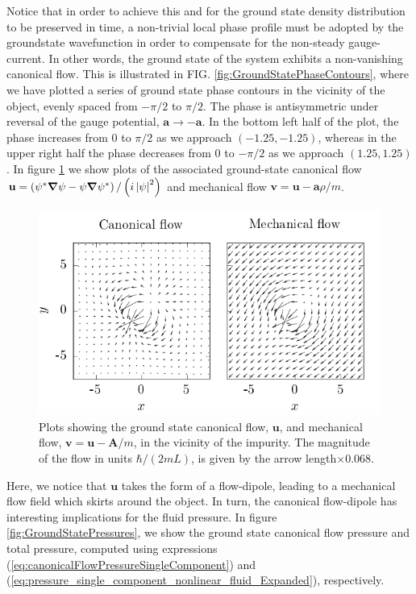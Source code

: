 \documentclass[twocolumn, nofootinbib, nobibnotes, amsmath,amssymb,aps, pra, floatfix]{revtex4-1}
\renewcommand{\v}[1]{\ensuremath{\mathbf{#1}}} %
\newcommand{\gv}[1]{\ensuremath{\mbox{\boldmath$ #1 $}}} %
\newcommand{\abs}[1]{\left| #1 \right|} %
\newcommand{\grad}[1]{\gv{\nabla} #1} %
\begin{document}
Notice that in order to achieve this and for the ground state density distribution to be preserved in time, a non-trivial local phase profile must be adopted by the groundstate wavefunction in order to compensate for the non-steady gauge-current.
In other words, the ground state of the system exhibits a non-vanishing canonical flow.
This is illustrated in FIG. \ref{fig:GroundStatePhaseContours}, where we have plotted a series of ground state phase contours in the vicinity of the object, evenly spaced from $-\pi/2$ to $\pi/2$.
The phase is antisymmetric under reversal of the gauge potential, $\v{a}\rightarrow -\v{a}$.
In the bottom left half of the plot, the phase increases from $0$ to $\pi/2$ as we approach $\left( -1.25,-1.25 \right)$, whereas in the upper right half the phase decreases from $0$ to $-\pi/2$ as we approach $\left( 1.25,1.25 \right)$.
In figure \ref{fig:GroundStateFlowFields} we show plots of the associated ground-state canonical flow $\v{u}=\left( \psi^*\grad{\psi} -\psi\grad{\psi^*}\right)/\left( i\abs{\psi}^2 \right)$ and mechanical flow $\v{v}=\v{u}-\v{a}\rho/m$.
\begin{figure}[h]
  \centering
  \includegraphics[width=\columnwidth]{./GroundState_a1FlowFields.pdf}
  \caption{Plots showing the ground state canonical flow, $\v{u}$, and mechanical flow, $\v{v}=\v{u}-\v{A}/m$, in the vicinity of the impurity. The magnitude of the flow in units $\hbar/\left( 2mL \right)$, is given by the arrow length$\times0.068$.}
  \label{fig:GroundStateFlowFields}
\end{figure}
Here, we notice that $\v{u}$ takes the form of a flow-dipole, leading to a mechanical flow field which skirts around the object.
In turn, the canonical flow-dipole has interesting implications for the fluid pressure.
In figure \ref{fig:GroundStatePressures}, we show the ground state canonical flow pressure and total pressure, computed using expressions (\ref{eq:canonicalFlowPressureSingleComponent}) and (\ref{eq:pressure_single_component_nonlinear_fluid_Expanded}), respectively.
\end{document}
